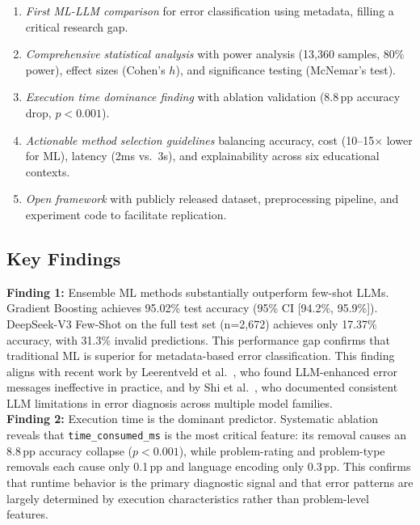 \documentclass[10pt,a4paper]{article}
\begin{document}
\begin{enumerate}
    \item \textit{First ML-LLM comparison} for error classification using
          metadata, filling a critical research gap.
    \item \textit{Comprehensive statistical analysis} with power analysis
          (13,360 samples, 80\% power), effect sizes (Cohen's $h$), and
          significance testing (McNemar's test).
    \item \textit{Execution time dominance finding} with ablation validation
          (8.8\,pp accuracy drop, $p < 0.001$).
    \item \textit{Actionable method selection guidelines} balancing accuracy,
          cost (10--15$\times$ lower for ML), latency (2ms vs.\ 3s), and
          explainability across six educational contexts.
    \item \textit{Open framework} with publicly released dataset, preprocessing
          pipeline, and experiment code to facilitate replication.
\end{enumerate}

\subsection*{Key Findings}

\textbf{Finding 1:} Ensemble ML methods substantially outperform few-shot
LLMs. Gradient Boosting achieves 95.02\% test accuracy (95\% CI [94.2\%,
95.9\%]). DeepSeek-V3 Few-Shot on the full test set (n=2,672) achieves only
17.37\% accuracy, with 31.3\% invalid predictions. This performance gap
confirms that traditional ML is superior for metadata-based error
classification. This finding aligns with recent work by Leerentveld et
al.~\cite{leerentveld2024not}, who found LLM-enhanced error messages
ineffective in practice, and by Shi et
al.~\cite{shi2025benchmarking}, who documented consistent LLM limitations in
error diagnosis across multiple model families.\\

\textbf{Finding 2:} Execution time is the dominant predictor. Systematic
ablation reveals that \texttt{time\_consumed\_ms} is the most critical
feature: its removal causes an 8.8\,pp accuracy collapse ($p < 0.001$), while
problem-rating and problem-type removals each cause only 0.1\,pp and language
encoding only 0.3\,pp. This confirms that runtime behavior is the primary
diagnostic signal and that error patterns are largely determined by execution
characteristics rather than problem-level features.\\
\end{document}
